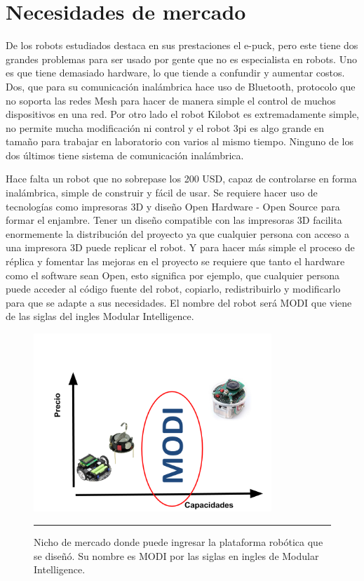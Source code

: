 \section{Necesidades de mercado}

De los robots estudiados destaca en sus prestaciones el e-puck, pero este tiene dos grandes problemas para ser usado por gente que no es especialista en robots. Uno es que tiene demasiado hardware, lo que tiende a confundir y aumentar costos. Dos, que para su comunicación inalámbrica hace uso de Bluetooth, protocolo que no soporta las redes Mesh para hacer de manera simple el control de muchos dispositivos en una red. Por otro lado el robot Kilobot es extremadamente simple, no permite mucha modificación ni control y el robot 3pi es algo grande en tamaño para trabajar en laboratorio con varios al mismo tiempo. Ninguno de los dos últimos tiene sistema de comunicación inalámbrica.

Hace falta un robot que no sobrepase los 200 USD, capaz de controlarse en forma inalámbrica, simple de construir y fácil de usar. Se requiere hacer uso de tecnologías como impresoras 3D y diseño Open Hardware - Open Source para formar el enjambre. Tener un diseño compatible con las impresoras 3D facilita enormemente la distribución del proyecto ya que cualquier persona con acceso a una impresora 3D puede replicar el robot. Y para hacer más simple el proceso de réplica y fomentar las mejoras en el proyecto se requiere que tanto el hardware como el software sean Open, esto significa por ejemplo, que cualquier persona puede acceder al código fuente del robot, copiarlo, redistribuirlo y modificarlo para que se adapte a sus necesidades. El nombre del robot será MODI que viene de las siglas del ingles Modular Intelligence.

\begin{figure}[htbp]
	\centering
		\includegraphics[width=0.8\textwidth]{./Figures/nicho.png}
		\rule{35em}{0.5pt}
	\caption[Nicho de mercado]{Nicho de mercado donde puede ingresar la plataforma robótica que se diseñó. Su nombre es MODI por las siglas en ingles de Modular Intelligence.}
	\label{fig:nicho}
\end{figure}



